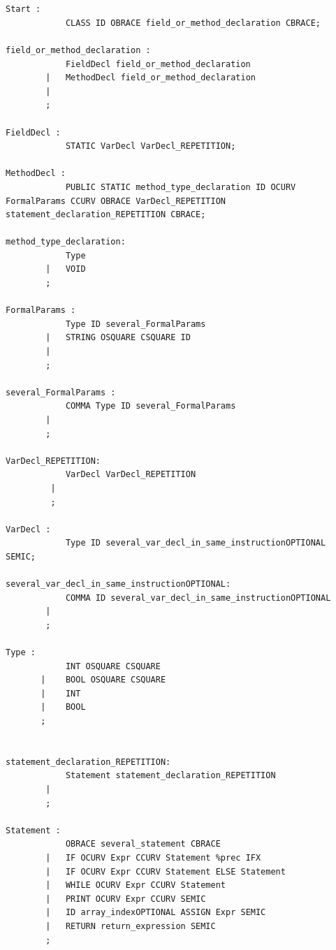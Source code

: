\documentclass[12pt]{article}
\begin{document}
\begin{lstlisting}


Start :
            CLASS ID OBRACE field_or_method_declaration CBRACE;

field_or_method_declaration :
            FieldDecl field_or_method_declaration               
        |   MethodDecl field_or_method_declaration              
        | 
        ;

FieldDecl :
            STATIC VarDecl VarDecl_REPETITION;

MethodDecl :
            PUBLIC STATIC method_type_declaration ID OCURV FormalParams CCURV OBRACE VarDecl_REPETITION statement_declaration_REPETITION CBRACE;

method_type_declaration:
            Type            
        |   VOID            
        ;

FormalParams : 
            Type ID several_FormalParams        
        |   STRING OSQUARE CSQUARE ID           
        |                                           
        ;

several_FormalParams : 
            COMMA Type ID several_FormalParams      
        |                                               
        ;

VarDecl_REPETITION:
            VarDecl VarDecl_REPETITION      
         |                                      
         ;

VarDecl :
            Type ID several_var_decl_in_same_instructionOPTIONAL SEMIC;

several_var_decl_in_same_instructionOPTIONAL:
            COMMA ID several_var_decl_in_same_instructionOPTIONAL       
        |                                                                   
        ;

Type :
            INT OSQUARE CSQUARE        
       |    BOOL OSQUARE CSQUARE       
       |    INT                        
       |    BOOL                       
       ;
    

statement_declaration_REPETITION:
            Statement statement_declaration_REPETITION          
        |                                                           
        ;

Statement : 
            OBRACE several_statement CBRACE                     
        |   IF OCURV Expr CCURV Statement %prec IFX             
        |   IF OCURV Expr CCURV Statement ELSE Statement        
        |   WHILE OCURV Expr CCURV Statement                    
        |   PRINT OCURV Expr CCURV SEMIC                        
        |   ID array_indexOPTIONAL ASSIGN Expr SEMIC            
        |   RETURN return_expression SEMIC                      
        ;


\end{lstlisting}
\end{document}
